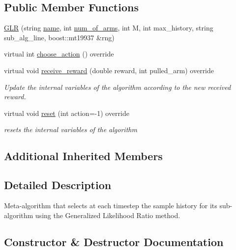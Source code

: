 \subsection*{Public Member Functions}
\begin{DoxyCompactItemize}
\item 
\mbox{\hyperlink{class_g_l_r_a1f48d3cb0d12e111c1bafd9acae3da6b}{G\+LR}} (string \mbox{\hyperlink{class_m_a_b_algorithm_a77b10ecc4b49d519c557f65358167b82}{name}}, int \mbox{\hyperlink{class_m_a_b_algorithm_a340fa9e83e85b092f2c6125fc4e8549b}{num\+\_\+of\+\_\+arms}}, int M, int max\+\_\+history, string sub\+\_\+alg\+\_\+line, boost\+::mt19937 \&rng)
\item 
virtual int \mbox{\hyperlink{class_g_l_r_ad6b3e9f19e0bea4d6067b491c33640e0}{choose\+\_\+action}} () override
\item 
virtual void \mbox{\hyperlink{class_g_l_r_ad8e409518a110bd57f42a2de1b759707}{receive\+\_\+reward}} (double reward, int pulled\+\_\+arm) override
\begin{DoxyCompactList}\small\item\em Update the internal variables of the algorithm according to the new received reward. \end{DoxyCompactList}\item 
virtual void \mbox{\hyperlink{class_g_l_r_ad6c979e855b56e80ecfc54c8c93f035e}{reset}} (int action=-\/1) override
\begin{DoxyCompactList}\small\item\em resets the internal variables of the algorithm \end{DoxyCompactList}\end{DoxyCompactItemize}
\subsection*{Additional Inherited Members}


\subsection{Detailed Description}
Meta-\/algorithm that selects at each timestep the sample history for its sub-\/algorithm using the Generalized Likelihood Ratio method. 

\subsection{Constructor \& Destructor Documentation}
\mbox{\label{class_g_l_r_a1f48d3cb0d12e111c1bafd9acae3da6b}} 
